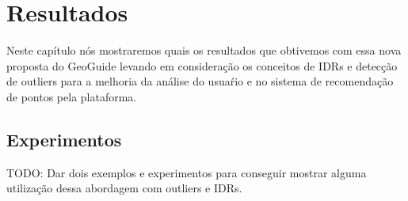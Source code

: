 \chapter{Resultados}

Neste capítulo nós mostraremos quais os resultados que obtivemos com essa nova proposta do GeoGuide levando em consideração os conceitos de IDRs e detecção de outliers para a melhoria da análise do usuaŕio e no sistema de recomendação de pontos pela plataforma.

\section{Experimentos}

TODO: Dar dois exemplos e experimentos para conseguir mostrar alguma utilização dessa abordagem com outliers e IDRs.